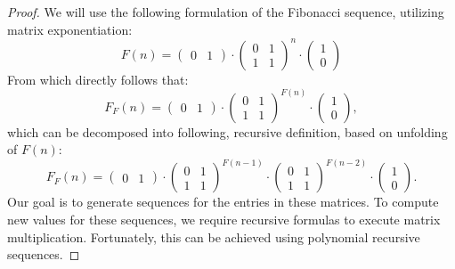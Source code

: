\documentclass[12pt]{article}
\theoremstyle{definition}
\begin{document}
\begin{proof}
    We will use the following formulation of the Fibonacci sequence, utilizing matrix exponentiation:
    $$F(n) = 
    \begin{pmatrix}
        0 & 1 
    \end{pmatrix}
    \cdot
    \begin{pmatrix}
        0 & 1\\ 
        1 & 1
    \end{pmatrix}^n
    \cdot
    \begin{pmatrix}
        1 \\
        0 
    \end{pmatrix}
    $$
    From which directly follows that:
    $$F_F(n) = 
    \begin{pmatrix}
        0 & 1 
    \end{pmatrix}
    \cdot
    \begin{pmatrix}
        0 & 1\\ 
        1 & 1
    \end{pmatrix}^{F(n)}
    \cdot
    \begin{pmatrix}
        1 \\
        0 
    \end{pmatrix},
    $$
    which can be decomposed into following, recursive definition, based on unfolding of $F(n)$:
    $$F_F(n) = 
    \begin{pmatrix}
        0 & 1 
    \end{pmatrix}
    \cdot
    \begin{pmatrix}
        0 & 1\\ 
        1 & 1
    \end{pmatrix}^{F(n-1)}
    \cdot
    \begin{pmatrix}
        0 & 1\\ 
        1 & 1
    \end{pmatrix}^{F(n-2)}
    \cdot
    \begin{pmatrix}
        1 \\
        0 
    \end{pmatrix}.
    $$
    Our goal is to generate sequences for the entries in these matrices. To compute new values for these sequences, we require recursive formulas to execute matrix multiplication. Fortunately, this can be achieved using polynomial recursive sequences.


\end{proof}
\end{document}
